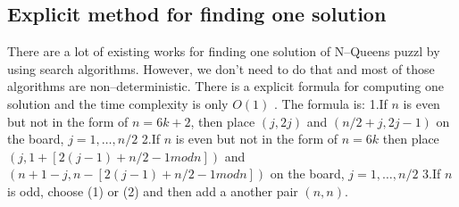 \subsection{Explicit method for finding one solution}
There are a lot of existing works for finding one solution of N--Queens puzzl by using search algorithms. However, we don't need to do that and most of those algorithms are non--deterministic. There is a explicit formula for computing one solution and the time complexity is only $O(1)$ \cite{bernhardsson_explicit_1991}. The formula is: 1.If $n$ is even but not in the form of  $n = 6k + 2$, then place $(j, 2j)$ and $(n/2+j, 2j-1)$ on the board, $j = 1,…,n/2$ 2.If $n$ is even but not in the form of $n = 6k$ then place $(j, 1+[2(j-1)+n/2-1 mod n])$ and $(n+1-j, n - [2(j-1)+n/2-1 mod n])$ on the board, $j = 1,…, n/2$ 3.If $n$ is odd, choose (1) or (2) and then add a another pair $(n,n)$.


